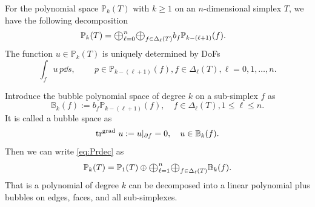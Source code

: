 \documentclass[mathpazo]{cicp}
\newcommand{\Oplus}{\ensuremath{\vcenter{\hbox{\scalebox{1.5}{$\oplus$}}}}}
\begin{document}
\begin{theorem}\label{thm:Lagrangedec}
For the polynomial space $\mathbb P_k(T)$ with $k\geq 1$ on an $n$-dimensional simplex $T$, we have the following decomposition %
\begin{align}
\label{eq:Prdec}
\mathbb P_k(T) &= \Oplus_{\ell = 0}^n\Oplus_{f\in \Delta_{\ell}(T)} b_f\mathbb P_{k - (\ell +1)} (f).
\end{align}
The function $u\in \mathbb P_k(T)$ is uniquely determined by DoFs
\begin{equation}\label{eq:dofPr}
\int_f u \, p \dd s, \quad \quad~p\in \mathbb P_{k - (\ell +1)} (f), f\in \Delta_{\ell}(T), \ell = 0,1,\ldots, n.
\end{equation}
\end{theorem}



Introduce the bubble polynomial space of degree $k$ on a sub-simplex $f$ as
$$
\mathbb B_{k}( f) := b_f\mathbb P_{k - (\ell +1)} (f), \quad f\in \Delta_{\ell}(T), 1\leq \ell \leq n.
$$
It is called a bubble space as
$$
\operatorname{tr}^{{\rm grad\,}} u := u|_{\partial f} = 0, \quad u\in \mathbb B_{k}( f).
$$
Then we can write \eqref{eq:Prdec} as
\begin{equation}\label{eq:Lagdecbubble}
\mathbb P_k(T) = \mathbb P_1(T)\oplus \Oplus_{\ell = 1}^n\Oplus_{f\in \Delta_{\ell}(T)} \mathbb B_{k}( f).
\end{equation}
That is a polynomial of degree $k$ can be decomposed into a linear polynomial plus bubbles on edges, faces, and all sub-simplexes. 
\end{document}
